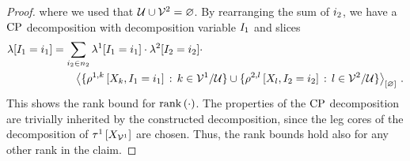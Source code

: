 \begin{proof}
    where we used that $\mathcal{U}\cup\mathcal{V}^{2}=\varnothing$.
    By rearranging the sum of $i_{2}$, we have a $\mathrm{CP}$ decomposition with decomposition variable $I_{1}$ and slices
    \begin{align*}
        \lambda[I_{1}=i_{1}]
        & = \sum_{i_{2}\in n_{2}}  \lambda^{1}[I_{1}=i_{1}] \cdot \lambda^{2}[I_{2}=i_{2}] \cdot \\
        & \quad \quad \left\langle \{\rho^{1,k}\left[X_{k},I_{1}=i_{1}\right] \,:\, k\in\mathcal{V}^{1}/\mathcal{U}\} \cup \{\rho^{2,l}\left[X_{l},I_{2}=i_{2}\right] \,:\, l\in\mathcal{V}^{2}/\mathcal{U}\}\right\rangle_{\left[ \varnothing \right]} \, .
    \end{align*}
    This shows the rank bound for $\mathrm{rank}\left(\cdot\right)$.
    The properties of the $\mathrm{CP}$ decomposition are trivially inherited by the constructed decomposition, since the leg cores of the decomposition of $\tau^{1}\left[X_{\mathcal{V}^{1}}\right]$ are chosen.
    Thus, the rank bounds hold also for any other rank in the claim.
\end{proof}

